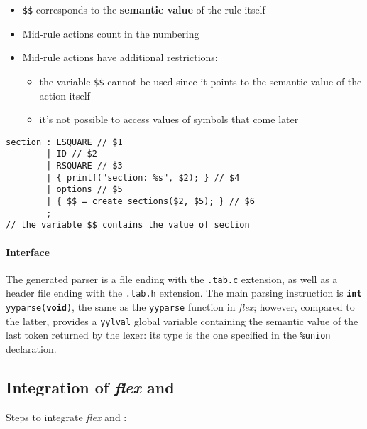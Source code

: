 \begin{itemize}
  \item \texttt{\$\$} corresponds to the \textbf{semantic value} of the rule itself
  \item Mid-rule actions count in the numbering
  \item Mid-rule actions have additional restrictions:
        \begin{itemize}
          \item the variable \texttt{\$\$} cannot be used since it points to the semantic value of the action itself
          \item it's not possible to access values of symbols that come later
        \end{itemize}
\end{itemize}

\begin{onepage}
  \begin{lstlisting}[language=LANCE, caption={Semantic value usage}, label={lst:bison-semantic-value-usage}]
section : LSQUARE // $1
        | ID // $2
        | RSQUARE // $3
        | { printf("section: %s", $2); } // $4
        | options // $5
        | { $$ = create_sections($2, $5); } // $6
        ;
// the variable $$ contains the value of section
\end{lstlisting}
\end{onepage}

\paragraph*{Interface}

The generated parser is a \clang file ending with the \texttt{.tab.c} extension, as well as a header file ending with the \texttt{.tab.h} extension.
The main parsing instruction is \texttt{\textbf{int} yyparse(\textbf{void})}, the same as the \texttt{yyparse} function in \textit{flex};
however, compared to the latter, \bison provides a \texttt{yylval} global variable containing the semantic value of the last token returned by the lexer:
its type is the one specified in the \texttt{\%union} declaration.

\subsection{Integration of \textit{flex} and \bison}

Steps to integrate \textit{flex} and \bison:

